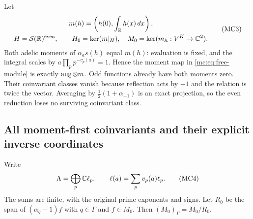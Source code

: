 Let
\[
 \begin{gathered} m(h)=\left(h(0),\int_{\mathbb R}h(x)\,dx\right),\\
 H=\mathcal S(\mathbb R)^{\mathrm{even}},\qquad H_0=\ker(m|_H),
 \quad M_0=\ker(m_{\mathbb A}:V^K\to\mathbb C^2).
 \end{gathered}\tag{MC3}\label{mc:eq:moments}
\]
Both adelic moments of $\alpha_as(h)$ equal $m(h)$: evaluation
is fixed, and the integral scales by
$a\prod_p p^{-v_p(a)}=1$. Hence the moment map in
\eqref{mc:eq:free-module} is exactly $\operatorname{aug}\otimes m$.
Odd functions already have both moments zero. Their coinvariant
classes vanish because reflection acts by $-1$ and the relation
is twice the vector. Averaging by $\tfrac12(1+\alpha_{-1})$ is
an exact projection, so the even reduction loses no surviving
coinvariant class.

\subsection{All moment-first coinvariants and their explicit inverse coordinates}

Write
\[
 \Lambda=\bigoplus_p\mathbb C\ell_p,
 \qquad \ell(a)=\sum_pv_p(a)\ell_p.
 \tag{MC4}\label{mc:eq:prime-vectors}
\]
The sums are finite, with the original prime exponents and signs.
Let $R_0$ be the span of $(\alpha_q-1)f$ with $q\in\Gamma$ and
$f\in M_0$. Then $(M_0)_\Gamma=M_0/R_0$.


